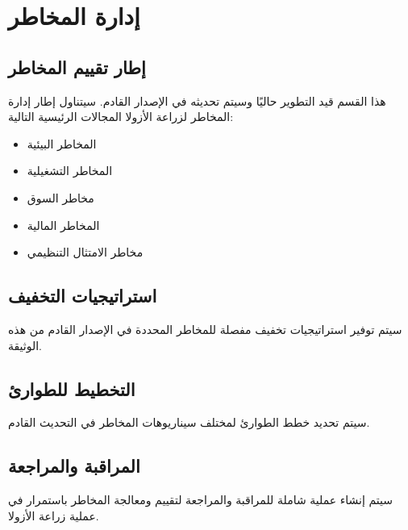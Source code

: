 \section{إدارة المخاطر}

\subsection{إطار تقييم المخاطر}

هذا القسم قيد التطوير حاليًا وسيتم تحديثه في الإصدار القادم. سيتناول إطار إدارة المخاطر لزراعة الأزولا المجالات الرئيسية التالية:

\begin{itemize}
    \item المخاطر البيئية
    \item المخاطر التشغيلية
    \item مخاطر السوق
    \item المخاطر المالية
    \item مخاطر الامتثال التنظيمي
\end{itemize}

\subsection{استراتيجيات التخفيف}

سيتم توفير استراتيجيات تخفيف مفصلة للمخاطر المحددة في الإصدار القادم من هذه الوثيقة.

\subsection{التخطيط للطوارئ}

سيتم تحديد خطط الطوارئ لمختلف سيناريوهات المخاطر في التحديث القادم.

\subsection{المراقبة والمراجعة}

سيتم إنشاء عملية شاملة للمراقبة والمراجعة لتقييم ومعالجة المخاطر باستمرار في عملية زراعة الأزولا.
